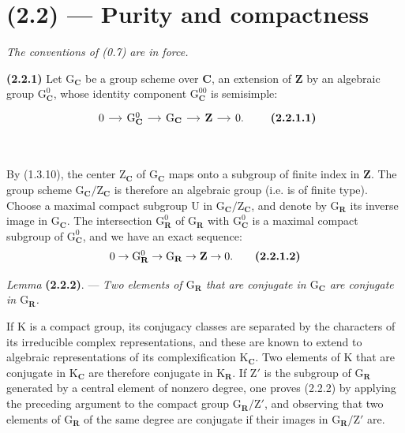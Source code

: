 \documentclass[11pt,leqno]{article}
\newcommand{\Page}[1]{\ifvmode\noindent\else\unskip\ \fi{\footnotesize\textcolor{gray}{[p.\,#1]}}\ \ignorespaces}
\begin{document}
\section*{(2.2) — Purity and compactness}

\textit{The conventions of \textup{(0.7)} are in force.}

\textbf{(2.2.1)} Let \(\mathrm{G}_{\mathbf{C}}\) be a group scheme over \(\mathbf{C}\), an extension of \(\mathbf{Z}\) by an algebraic group \(\mathrm{G}_{\mathbf{C}}^0\), whose identity component \(\mathrm{G}_{\mathbf{C}}^{00}\) is semisimple:
\[
\begin{tikzcd}[column sep=1.2em]
0 \arrow[r]
  & \mathrm{G}_{\mathbf{C}}^0 \arrow[r]
  & \mathrm{G}_{\mathbf{C}} \arrow[r]
  & \mathbf{Z} \arrow[r]
  & 0.
\end{tikzcd}
\tag*{\textbf{(2.2.1.1)}}
\]

\Page{193}

By (1.3.10), the center \(\mathrm Z_{\mathbf C}\) of \(\mathrm G_{\mathbf C}\) maps onto a subgroup of finite index in \(\mathbf Z\). The group scheme \(\mathrm G_{\mathbf C}/\mathrm Z_{\mathbf C}\) is therefore an algebraic group (i.e. is of finite type). Choose a maximal compact subgroup \(\mathrm U\) in \(\mathrm G_{\mathbf C}/\mathrm Z_{\mathbf C}\), and denote by \(\mathrm G_{\mathbf R}\) its inverse image in \(\mathrm G_{\mathbf C}\). The intersection \(\mathrm G_{\mathbf R}^0\) of \(\mathrm G_{\mathbf R}\) with \(\mathrm G_{\mathbf C}^0\) is a maximal compact subgroup of \(\mathrm G_{\mathbf C}^0\), and we have an exact sequence:
\[
0\to\mathrm G_{\mathbf R}^0\to\mathrm G_{\mathbf R}\to\mathbf Z\to0.
\tag*{\textbf{(2.2.1.2)}}
\]

\textit{Lemma} \textbf{(2.2.2)}. — \textit{Two elements of \(\mathrm G_{\mathbf R}\) that are conjugate in \(\mathrm G_{\mathbf C}\) are conjugate in \(\mathrm G_{\mathbf R}\).}

If \(\mathrm K\) is a compact group, its conjugacy classes are separated by the characters of its irreducible complex representations, and these are known to extend to algebraic representations of its complexification \(\mathrm K_{\mathbf C}\). Two elements of \(\mathrm K\) that are conjugate in \(\mathrm K_{\mathbf C}\) are therefore conjugate in \(\mathrm K_{\mathbf R}\). If \(\mathrm Z'\) is the subgroup of \(\mathrm G_{\mathbf R}\) generated by a central element of nonzero degree, one proves (2.2.2) by applying the preceding argument to the compact group \(\mathrm G_{\mathbf R}/\mathrm Z'\), and observing that two elements of \(\mathrm G_{\mathbf R}\) of the same degree are conjugate if their images in \(\mathrm G_{\mathbf R}/\mathrm Z'\) are.
\end{document}
